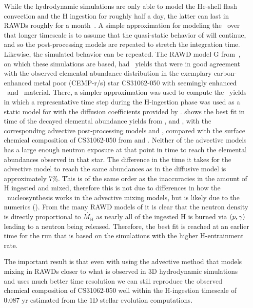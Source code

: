 \documentclass[fleqn,usenatbib]{mnras}
\begin{document}
While the hydrodynamic simulations are only able to model the He-shell flash
convection and the H ingestion for roughly half a day, the latter can last in RAWDs
roughly for a month~\citep{Denissenkov:19}. A simple approximation for modeling the \ipr~over
that longer timescale is to assume that the quasi-static behavior of 
will continue, and so the post-processing models are repeated to stretch the integration time. Likewise,
the  simulated behavior can be repeated. The RAWD model G from~\citet{Denissenkov:19},
on which these simulations are based, had \ipr~yields that were in good
agreement with the observed elemental abundance distribution in the exemplary
carbon-enhanced metal poor (CEMP-r/s) star CS31062-050 with seemingly enhanced
\spr~and \rpr~material. There, a simpler approximation was used to compute the
\ipr~yields in which a representative time step during the H-ingestion phase was
used as a static model for  with the diffusion coefficients provided
by  \citep{Denissenkov:19, Paxton2011}.
 shows the best fit in time of the decayed elemental
abundance yields from , and , with the corresponding
advective post-processing models  and , compared with the surface chemical composition of
CS31062-050 from \cite{aoki:02c} and \cite{johnson:04}. Neither of the advective models has a large enough neutron
exposure at that point in time to reach the  elemental abundances
observed in that star. 
The difference in the time it takes for the advective
model to reach the same  abundances as in the diffusive model is approximately 7\%. This is
of the same order as the inaccuracies in the amount of H ingested and mixed, therefore
this is not due to differences in how the
\ipr~nucleosynthesis works in the advective mixing models, but is likely due to
the numerics (). From
the many RAWD models of \citet{Denissenkov:19} it is clear that the neutron
density is directly proportional to $\dot{M_{\mathrm{H}}}$ as nearly all of the
ingested H is burned via $(p,\gamma)$ leading to a
neutron being released. Therefore, the best fit is reached at an earlier time
for the  run that is based on the  simulations with
the higher H-entrainment rate.

The important result is that even with using the advective method that 
models mixing in RAWDs closer to what is observed in 3D hydrodynamic simulations
and uses much better time resolution we can still reproduce the observed chemical
composition of CS31062-050 well within the H-ingestion timescale of 0.087 yr estimated from
the 1D stellar evolution computations.
\end{document}
